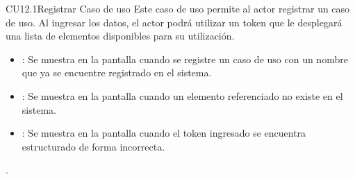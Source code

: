 \begin{UseCase}{CU12.1}{Registrar Caso de uso}{
			Este caso de uso permite al actor registrar un caso de uso. Al ingresar los datos, el actor podrá utilizar un token que le desplegará una lista de elementos disponibles para su utilización.
	}
{\begin{itemize}
		\item {}: Se muestra en la pantalla  cuando se registre un caso de uso con un nombre que ya se encuentre registrado en el sistema.
		\item {}: Se muestra en la pantalla  cuando un elemento referenciado no existe en el sistema.
		\item {}: Se muestra en la pantalla  cuando el token ingresado se encuentra estructurado de forma incorrecta.
		\end{itemize}.
		}
	\end{UseCase}
